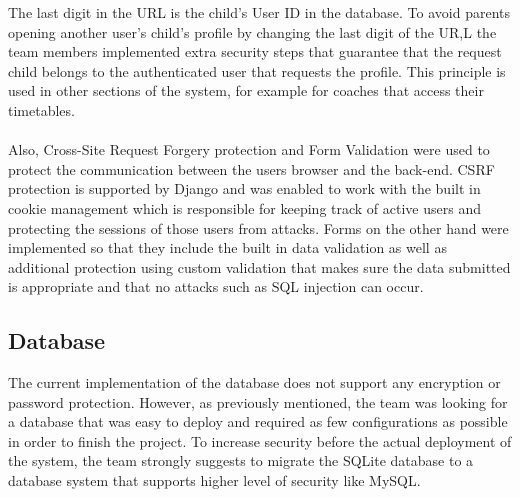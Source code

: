 \documentclass{l3proj}
\begin{document}
The last digit in the URL is the child's User ID in the database. To avoid parents opening another user's child's profile by changing the last digit of the UR,L the team members implemented extra security steps that guarantee that the request child belongs to the authenticated user that requests the profile. This principle is used in other sections of the system, for example for coaches that access their timetables.
\\
\\ Also, Cross-Site Request Forgery protection and Form Validation were used to protect the communication between the users browser and the back-end. CSRF protection is supported by Django and was enabled to work with the built in cookie management which is responsible for keeping track of active users and protecting the sessions of those users from attacks. Forms on the other hand were implemented so that they include the built in data validation as well as additional protection using custom validation that makes sure the data submitted is appropriate and that no attacks such as SQL injection can occur.

\subsection{Database}
The current implementation of the database does not support any encryption or password protection. However, as previously mentioned, the team was looking for a database that was easy to deploy and required as few configurations as possible in order to finish the project. To increase security before the actual deployment of the system, the team strongly suggests to migrate the SQLite database to a database system that supports higher level of security like MySQL.
\end{document}
